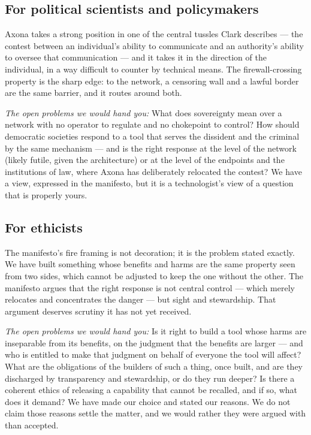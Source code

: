 \documentclass[nobib,justified]{tufte-handout}
\begin{document}
\subsection{For political scientists and policymakers}

Axona takes a strong position in one of the central tussles Clark describes ---
the contest between an individual's ability to communicate and an authority's
ability to oversee that communication --- and it takes it in the direction of the
individual, in a way difficult to counter by technical means. The firewall-crossing
property is the sharp edge: to the network, a censoring wall and a lawful border
are the same barrier, and it routes around both.

\emph{The open problems we would hand you:} What does sovereignty mean over a
network with no operator to regulate and no chokepoint to control? How should
democratic societies respond to a tool that serves the dissident and the criminal
by the same mechanism --- and is the right response at the level of the network
(likely futile, given the architecture) or at the level of the endpoints and the
institutions of law, where Axona has deliberately relocated the contest? We have a
view, expressed in the manifesto, but it is a technologist's view of a question
that is properly yours.

\subsection{For ethicists}

The manifesto's fire framing is not decoration; it is the problem stated exactly. We have built something whose benefits and harms are the same property
seen from two sides, which cannot be adjusted to keep the one without the other.
The manifesto argues that the right response is not central control --- which
merely relocates and concentrates the danger --- but sight and stewardship. That
argument deserves scrutiny it has not yet received.

\emph{The open problems we would hand you:} Is it right to build a tool whose harms
are inseparable from its benefits, on the judgment that the benefits are larger ---
and who is entitled to make that judgment on behalf of everyone the tool will
affect? What are the obligations of the builders of such a thing, once built, and
are they discharged by transparency and stewardship, or do they run deeper? Is
there a coherent ethics of releasing a capability that cannot be recalled, and if
so, what does it demand? We have made our choice and stated our reasons. We do not
claim those reasons settle the matter, and we would rather they were argued with
than accepted.
\end{document}
